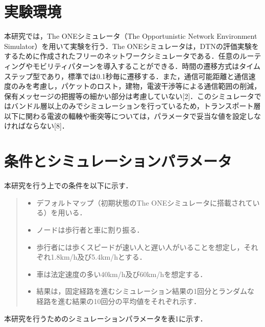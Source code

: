 \documentclass[11pt]{icsthesis}
\begin{document}
\section{実験環境}
本研究では，The ONEシミュレータ（The Opportunistic Network Environment Simulator）を用いて実験を行う．The ONEシミュレータは，DTNの評価実験をするために作成されたフリーのネットワークシミュレータである．任意のルーティングやモビリティパターンを導入することができる．時間の遷移方式はタイムステップ型であり，標準では0.1秒毎に遷移する．また，通信可能距離と通信速度のみを考慮し，パケットのロスト，建物，電波干渉等による通信範囲の削減，保有メッセージの把握等の細かい部分は考慮していない[2]．このシミュレータではバンドル層以上のみでシミュレーションを行っているため，トランスポート層以下に関わる電波の輻輳や衝突等については，パラメータで妥当な値を設定しなければならない[8]．

\section{条件とシミュレーションパラメータ}
本研究を行う上での条件を以下に示す．
\begin{quote}
 \begin{itemize}
  \item デフォルトマップ（初期状態のThe ONEシミュレータに搭載されている）を用いる．
  \item ノードは歩行者と車に割り振る．
  \item 歩行者には歩くスピードが速い人と遅い人がいることを想定し，それぞれ1.8km/h及び5.4km/hとする．
  \item 車は法定速度の多い40km/h及び60km/hを想定する．
  \item 結果は，固定経路を進むシミュレーション結果の1回分とランダムな経路を進む結果の10回分の平均値をそれぞれ示す．
 \end{itemize}
\end{quote}
本研究を行うためのシミュレーションパラメータを表1に示す．
\end{document}
